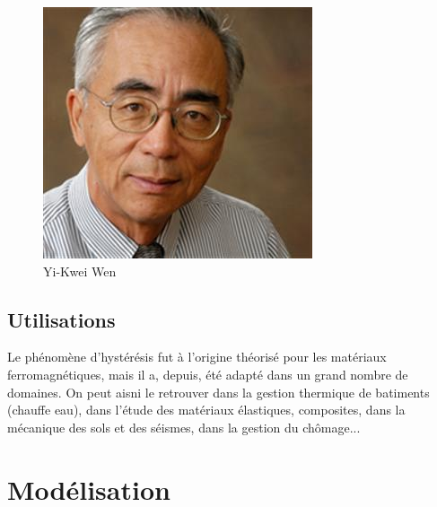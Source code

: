 \documentclass[11pt]{article}
\begin{document}
\begin{figure}[H]
\begin{minipage}{0.27\textwidth}
      \includegraphics[width=\textwidth]{Yi-Wen.jpeg}
      \caption{Yi-Kwei Wen}
    \end{minipage}
  \end{figure}
  
\subsection{Utilisations}
Le phénomène d'hystérésis fut à l'origine théorisé pour les matériaux ferromagnétiques, mais il a, depuis,
été adapté dans un grand nombre de domaines. On peut aisni le retrouver dans la gestion thermique de batiments (chauffe eau),
dans l'étude des matériaux élastiques, composites, dans la mécanique des sols et des séismes, dans la gestion du chômage... 

\section{Modélisation}
\end{document}
